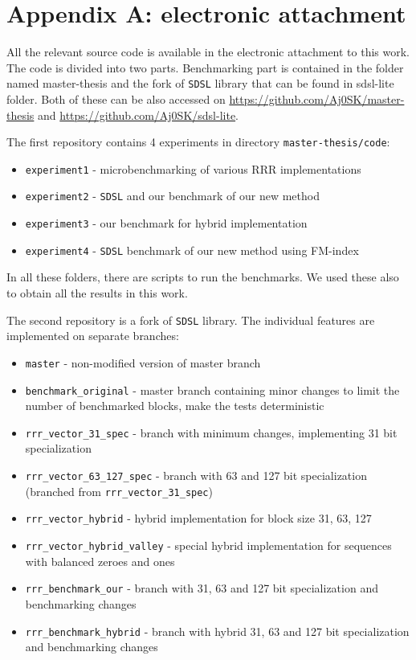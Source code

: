 \chapter*{Appendix A: electronic attachment}
\label{kap:kapAppendixA}

All the relevant source code is available in the electronic attachment to this work.
The code is divided into two parts. Benchmarking part is contained in the folder named
master-thesis and the fork of \texttt{SDSL} library that can be found in sdsl-lite folder.
Both of these can be also accessed on \url{https://github.com/Aj0SK/master-thesis} and
\url{https://github.com/Aj0SK/sdsl-lite}.

The first repository contains 4 experiments in directory \texttt{master-thesis/code}:
\begin{itemize}
    \item \texttt{experiment1} - microbenchmarking of various RRR implementations
    \item \texttt{experiment2} - \texttt{SDSL} and our benchmark of our new method
    \item \texttt{experiment3} - our benchmark for hybrid implementation
    \item \texttt{experiment4} - \texttt{SDSL} benchmark of our new method using FM-index
\end{itemize}
In all these folders, there are scripts to run the benchmarks. We used these also to obtain
all the results in this work. 

The second repository is a fork of \texttt{SDSL} library. The individual features are implemented
on separate branches:
\begin{itemize}
    \item \texttt{master} - non-modified version of master branch
    \item \texttt{benchmark\_original} - master branch containing minor changes
        to limit the number of benchmarked blocks, make the tests deterministic
    \item \texttt{rrr\_vector\_31\_spec} - branch with minimum changes, implementing 31 bit specialization
    \item \texttt{rrr\_vector\_63\_127\_spec} - branch with 63 and 127 bit specialization (branched from \texttt{rrr\_vector\_31\_spec})
    \item \texttt{rrr\_vector\_hybrid} - hybrid implementation for block size 31, 63, 127
    \item \texttt{rrr\_vector\_hybrid\_valley} - special hybrid implementation for sequences with balanced zeroes and ones
    \item \texttt{rrr\_benchmark\_our} - branch with 31, 63 and 127 bit specialization and benchmarking changes
    \item \texttt{rrr\_benchmark\_hybrid} - branch with hybrid 31, 63 and 127 bit specialization and benchmarking changes
\end{itemize}
